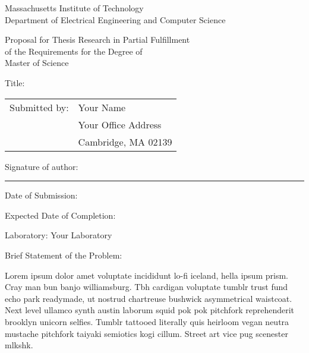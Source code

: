 
\begingroup
{}\large\selectfont


\begin{center}
Massachusetts Institute of Technology \\
Department of Electrical Engineering and Computer Science
\end{center}

\begin{center}
Proposal for Thesis Research in Partial Fulfillment \\
of the Requirements for the Degree of \\
Master of Science
\end{center}

\vspace{1em}
\noindent Title: \mytitle

\vspace{1em}
\noindent\begin{tabular}{@{}ll}
Submitted by: & Your Name\\
              & Your Office Address \\
              & Cambridge, MA 02139
\end{tabular}

\vspace{1em}
\noindent Signature of author: \rule{5cm}{0.1pt}

\vspace{1em}
\noindent Date of Submission: \mydate

\vspace{1em}
\noindent Expected Date of Completion: \mycompletion

\vspace{1em}
\noindent Laboratory: Your Laboratory

\vspace{1em}
\noindent Brief Statement of the Problem:

\vspace{1em}
\begin{minipage}{\dimexpr\textwidth-1cm}

\noindent Lorem ipsum dolor amet voluptate incididunt lo-fi iceland, hella ipsum prism. Cray
    man bun banjo williamsburg. Tbh cardigan voluptate tumblr trust fund echo park
    readymade, ut nostrud chartreuse bushwick asymmetrical waistcoat. Next level ullamco
    synth austin laborum squid pok pok pitchfork reprehenderit brooklyn unicorn selfies.
    Tumblr tattooed literally quis heirloom vegan neutra mustache pitchfork taiyaki
    semiotics kogi cillum. Street art vice pug scenester mlkshk.

\end{minipage}

